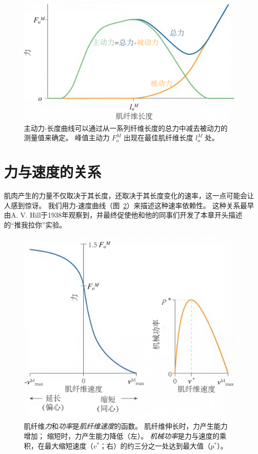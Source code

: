 \begin{figure}[!htb]
	\centering
	\includegraphics[width=0.7\linewidth]{chap4/4_8}
	\caption{\textcolor[RGB]{124,176,128}{主动力}-长度曲线可以通过从一系列纤维长度的\textcolor[RGB]{27,85,123}{总力}中减去\textcolor[RGB]{255,165,45}{被动力}的测量值来确定。
		峰值主动力 $F_o^M$ 出现在最佳肌纤维长度 $l_o^M$ 处。 \label{fig:4_8}}
\end{figure}


\section{力与速度的关系}

肌肉产生的力量不仅取决于其长度，还取决于其长度变化的速率，这一点可能会让人感到惊讶。
我们用力-速度曲线（图~\ref{fig:4_9}）来描述这种速率依赖性。
这种关系最早由A. V. Hill于1938年观察到，并最终促使他和他的同事们开发了本章开头描述的“推我拉你”实验。

\begin{figure}[!htb]
	\centering
	\includegraphics[width=0.7\linewidth]{chap4/4_9}
	\caption{肌纤维\textit{力}和\textit{功率}是\textit{肌纤维速度}的函数。
		肌纤维伸长时，力产生能力增加；
		缩短时，力产生能力降低（左）。
		\textit{机械功率}是力与速度的乘积，在最大缩短速度（$v^*$；右）的约三分之一处达到最大值（$p^*$）。 \label{fig:4_9}}
\end{figure}

